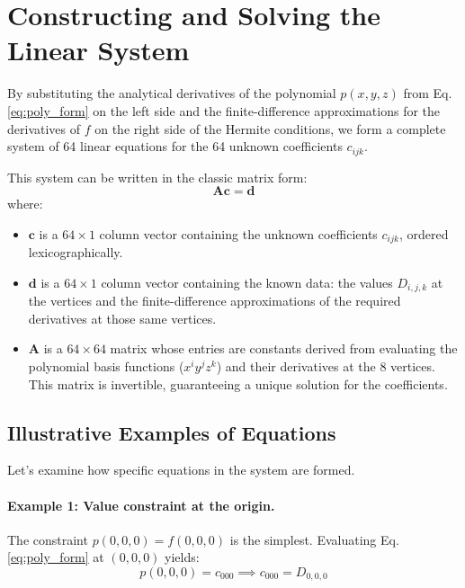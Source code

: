 \documentclass[12pt]{article}
\newcommand{\mat}[1]{\mathbf{#1}}
\newcommand{\vect}[1]{\mathbf{#1}}
\newcommand{\data}[3]{D_{#1,#2,#3}}
\begin{document}
\section{Constructing and Solving the Linear System}

By substituting the analytical derivatives of the polynomial $p(x,y,z)$ from Eq. \eqref{eq:poly_form} on the left side and the finite-difference approximations for the derivatives of $f$ on the right side of the Hermite conditions, we form a complete system of 64 linear equations for the 64 unknown coefficients $c_{ijk}$.

This system can be written in the classic matrix form:
\begin{equation}
    \mat{A} \vect{c} = \vect{d}
\end{equation}
where:
\begin{itemize}
    \item $\vect{c}$ is a $64 \times 1$ column vector containing the unknown coefficients $c_{ijk}$, ordered lexicographically.
    \item $\vect{d}$ is a $64 \times 1$ column vector containing the known data: the values $\data{i}{j}{k}$ at the vertices and the finite-difference approximations of the required derivatives at those same vertices.
    \item $\mat{A}$ is a $64 \times 64$ matrix whose entries are constants derived from evaluating the polynomial basis functions ($x^i y^j z^k$) and their derivatives at the 8 vertices. This matrix is invertible, guaranteeing a unique solution for the coefficients.
\end{itemize}

\subsection{Illustrative Examples of Equations}

Let's examine how specific equations in the system are formed.

\paragraph{Example 1: Value constraint at the origin.}
The constraint $p(0,0,0) = f(0,0,0)$ is the simplest. Evaluating Eq. \eqref{eq:poly_form} at $(0,0,0)$ yields:
\begin{equation}
    p(0,0,0) = c_{000} \implies c_{000} = \data{0}{0}{0}
\end{equation}
\end{document}
